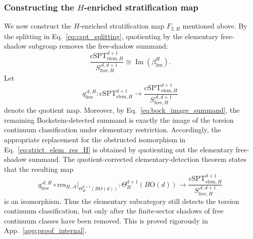 \documentclass[aps,prx,reprint,superscriptaddress,twocolumn,amsmath,amssymb,amsfonts, nofootinbib]{revtex4-2}
\newcommand{\res}{\text{res}}
\theoremstyle{apsstyle}
\begin{document}
\subsubsection{Constructing the $H$-enriched stratification map}
\label{sec:constr}
We now construct the $H$-enriched stratification map $F_{2,H}$ mentioned above. 
By the splitting in Eq.~\eqref{eq:cspt_splitting}, quotienting by the elementary free-shadow subgroup removes the free-shadow summand:
\begin{equation*}
\frac{\mathrm{cSPT}^{d+1}_{\mathrm{elem},H}}
{S_{\mathrm{free},H}^{\mathcal A,d+1}}
\cong
\operatorname{Im}(\beta_{\lim}^{H}).
\end{equation*}
Let
\begin{equation*}
q_{\mathrm{free}}^{\mathcal A,H}: \mathrm{cSPT}^{d+1}_{\mathrm{elem},H}
\longrightarrow \frac{\mathrm{cSPT}^{d+1}_{\mathrm{elem},H}}{S_{\mathrm{free},H}^{\mathcal A,d+1}}
\end{equation*}
denote the quotient map. Moreover, by Eq.~\eqref{eq:bock_image_summand}, the remaining Bockstein-detected summand is exactly the image of the torsion continuum classification under elementary restriction. Accordingly, the appropriate replacement for the obstructed isomorphism in Eq.~\eqref{eq:strict_elem_res_H} is obtained by quotienting out the elementary free-shadow summand. The quotient-corrected elementary-detection theorem states that the resulting map
\begin{equation}
\label{eq:mod_detection_thm}
q_{\mathrm{free}}^{\mathcal A,H}
\circ
\res_{H,\mathcal A}
\big|_{\Theta^{d+1}_{H}(B\mathrm{O}(d))}
:
\Theta^{d+1}_{H}(B\mathrm{O}(d))
\longrightarrow
\frac{\mathrm{cSPT}^{d+1}_{\mathrm{elem},H}}
{S_{\mathrm{free},H}^{\mathcal A,d+1}}
\end{equation}
is an isomorphism. Thus the elementary subcategory still detects the torsion continuum classification, but only after the finite-sector shadows of free continuum classes have been removed. This is proved rigorously in App.~\ref{app:proof_internal}.

\bigskip 
\end{document}
